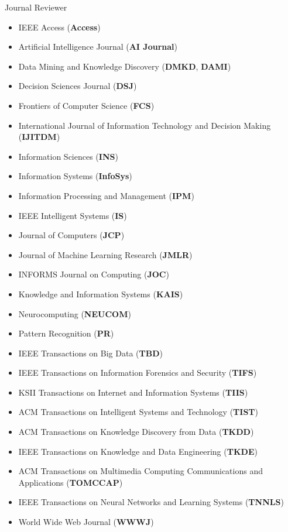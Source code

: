 \documentclass[margin, 9pt]{res}
\begin{document}
\begin{resume}
{Journal Reviewer}
\begin{itemize}
\item IEEE Access (\textbf{Access})
\item Artificial Intelligence Journal (\textbf{AI Journal})	
\item Data Mining and Knowledge Discovery (\textbf{DMKD}, \textbf{DAMI})
\item Decision Sciences Journal (\textbf{DSJ})
\item Frontiers of Computer Science (\textbf{FCS})
\item International Journal of Information Technology and Decision Making (\textbf{IJITDM})
\item Information Sciences (\textbf{INS})
\item Information Systems (\textbf{InfoSys})
\item Information Processing and Management (\textbf{IPM})
\item IEEE Intelligent Systems (\textbf{IS})
\item Journal of Computers (\textbf{JCP})
\item Journal of Machine Learning Research (\textbf{JMLR})
\item INFORMS Journal on Computing (\textbf{JOC})
\item Knowledge and Information Systems (\textbf{KAIS})
\item Neurocomputing (\textbf{NEUCOM})
\item Pattern Recognition (\textbf{PR})
\item IEEE Transactions on Big Data (\textbf{TBD})
\item IEEE Transactions on Information Forensics and Security (\textbf{TIFS})
\item KSII Transactions on Internet and Information Systems (\textbf{TIIS})
\item ACM Transactions on Intelligent Systems and Technology (\textbf{TIST})
\item ACM Transactions on Knowledge Discovery from Data (\textbf{TKDD})
\item IEEE Transactions on Knowledge and Data Engineering (\textbf{TKDE})
\item ACM Transactions on Multimedia Computing Communications and Applications (\textbf{TOMCCAP})
\item IEEE Transactions on Neural Networks and Learning Systems (\textbf{TNNLS})	
\item World Wide Web Journal (\textbf{WWWJ})
\end{itemize}
\vspace{-0.1in}


\end{resume}
\end{document}
